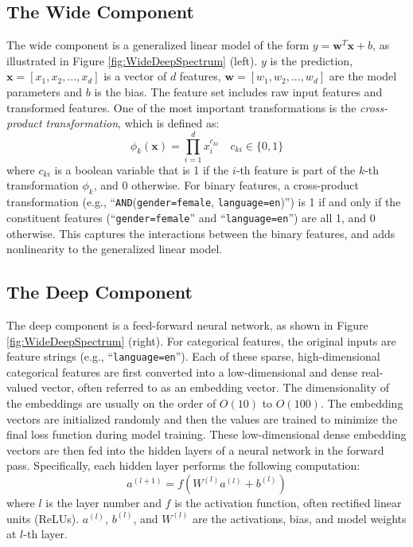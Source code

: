 \documentclass{sig-alternate-05-2015}
\begin{document}
\subsection{The Wide Component}
The wide component is a generalized linear model of the form $y = \mathbf{w}^T\mathbf{x}+b$, as illustrated in Figure \ref{fig:WideDeepSpectrum} (left). $y$ is the prediction, $\mathbf{x}=[x_1, x_2, ..., x_d]$ is a vector of $d$ features, $\mathbf{w}=[w_1, w_2, ..., w_d]$ are the model parameters and $b$ is the bias. The feature set includes raw input features and transformed features. One of the most important transformations is the \textit{cross-product transformation}, which is defined as:
\begin{equation}
\phi_k(\mathbf{x}) = \prod_{i=1}^{d} x_i^{c_{ki}} \quad c_{ki} \in \{0,1\}
\end{equation}
where $c_{ki}$ is a boolean variable that is 1 if the $i$-th feature is part of the $k$-th transformation $\phi_k$, and 0 otherwise. For binary features, a cross-product transformation (e.g., ``\texttt{AND}(\texttt{gender=female}, \texttt{language=en})'') is 1 if and only if the constituent features (``\texttt{gender=female}'' and ``\texttt{language=en}'') are all 1, and 0 otherwise.
This captures the interactions between the binary features, and adds nonlinearity to the generalized linear model.

\subsection{The Deep Component}
The deep component is a feed-forward neural network, as shown in Figure \ref{fig:WideDeepSpectrum} (right).
For categorical features, the original inputs are feature strings (e.g., ``\texttt{language=en}''). Each of these sparse, high-dimensional categorical features are first converted into a low-dimensional and dense real-valued vector, often referred to as an embedding vector. The dimensionality of the embeddings are usually on the order of $O(10)$ to $O(100)$. The embedding vectors are initialized randomly and then the values are trained to minimize the final loss function during model training. These low-dimensional dense embedding vectors are then fed into the hidden layers of a neural network in the forward pass. Specifically, each hidden layer performs the following computation:
\begin{equation}
a^{(l+1)} = f(W^{(l)} a^{(l)} + b^{(l)})
\end{equation}
where $l$ is the layer number and $f$ is the activation function, often rectified linear units (ReLUs). $a^{(l)}$, $b^{(l)}$, and $W^{(l)}$ are the activations, bias, and model weights at $l$-th layer.
\end{document}
